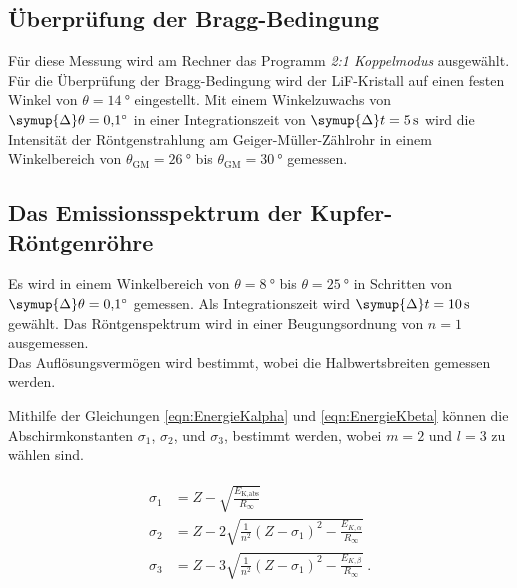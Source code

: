 \subsection{Überprüfung der Bragg-Bedingung}

    Für diese Messung wird am Rechner das Programm \textit{2:1 Koppelmodus} ausgewählt.
    Für die Überprüfung der Bragg-Bedingung wird der LiF-Kristall auf einen festen Winkel von $\theta = \SI{14}{\degree}$ eingestellt.
    Mit einem Winkelzuwachs von $\symup{\Delta}\theta = \SI{0.1}{\degree}$ in einer Integrationszeit von $\symup{\Delta}t = \SI{5}{\second}$
    wird die Intensität der Röntgenstrahlung am Geiger-Müller-Zählrohr in einem Winkelbereich von $\theta_\text{GM} = \SI{26}{\degree}$
    bis $\theta_\text{GM} = \SI{30}{\degree}$ gemessen.


\subsection{Das Emissionsspektrum der Kupfer-Röntgenröhre}

    Es wird in einem Winkelbereich von $\theta = \SI{8}{\degree}$ bis $\theta = \SI{25}{\degree}$ in Schritten von $\symup{\Delta}\theta = \SI{0.1}{\degree}$ gemessen.
    Als Integrationszeit wird $\symup{\Delta}t = \SI{10}{\second}$ gewählt.
    Das Röntgenspektrum wird in einer Beugungsordnung von $n=1$ ausgemessen.
    \\
    Das Auflösungsvermögen wird
    bestimmt,
    wobei die Halbwertsbreiten gemessen werden.

    Mithilfe der Gleichungen \eqref{eqn:EnergieKalpha} und \eqref{eqn:EnergieKbeta} können die Abschirmkonstanten $\sigma_1$, $\sigma_2$, und $\sigma_3$, bestimmt werden,
    wobei $m=2$ und $l=3$ zu wählen sind.

    \begin{align}
    \begin{split}
        \label{eqn:sigma_123}
        \sigma_1 &= Z -   \sqrt{\frac{E_\text{K,abs}}{R_\infty}} \\
        \sigma_2 &= Z - 2 \sqrt{\frac{1}{n^2} (Z - \sigma_1)^2-\frac{E_{K,\alpha}}{R_\infty}} \\
        \sigma_3 &= Z - 3 \sqrt{\frac{1}{n^2} (Z - \sigma_1)^2-\frac{E_{K,\beta}}{R_\infty}} \; .
    \end{split}
    \end{align}


